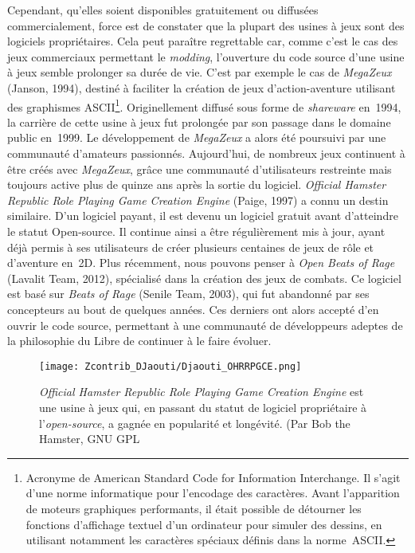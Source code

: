 \documentclass{FramateX}
\begin{document}
\begin{refsection}
Cependant, qu'elles soient disponibles gratuitement ou diffusées
commercialement, force est de constater que la plupart des usines à
jeux sont des logiciels propriétaires. Cela peut paraître regrettable
car, comme c'est le cas des jeux commerciaux permettant le
\textit{modding}, l'ouverture du code source d'une usine à jeux semble prolonger sa durée
de vie. C'est par exemple le cas de
\textit{MegaZeux} (Janson, 1994), destiné à
faciliter la création de jeux d'action-aventure utilisant des
graphismes ASCII\footnote{Acronyme de
American Standard Code for Information Interchange. Il s'agit d'une norme
informatique pour l'encodage des caractères. Avant l'apparition de
moteurs graphiques performants, il était possible de détourner les
fonctions d'affichage textuel d'un ordinateur pour simuler des dessins,
en utilisant notamment les caractères spéciaux définis dans la norme~ASCII.}.
Originellement diffusé sous forme de \textit{shareware} en~1994, la carrière de
cette usine à jeux fut prolongée par son passage dans le domaine public
en~1999. Le développement de
\textit{MegaZeux} a alors été poursuivi par
une communauté d'amateurs passionnés. Aujourd'hui, de nombreux jeux
continuent à être créés avec
\textit{MegaZeux}, grâce une communauté
d'utilisateurs restreinte mais toujours active plus de quinze ans après
la sortie du logiciel. \textit{Official
Hamster Republic Role Playing Game Creation Engine} (Paige, 1997) a
connu un destin similaire. D'un logiciel payant, il est devenu un
logiciel gratuit avant d'atteindre le statut Open-source. Il continue
ainsi a être régulièrement mis à jour, ayant déjà permis à ses
utilisateurs de créer plusieurs centaines de jeux de rôle et d'aventure
en~2D. Plus récemment, nous pouvons penser à
\textit{Open Beats of Rage} (Lavalit Team, 2012), spécialisé dans la création des jeux de combats. Ce logiciel est
basé sur \textit{Beats of Rage} (Senile Team,
2003), qui fut abandonné par ses concepteurs au bout de quelques
années. Ces derniers ont alors accepté d'en ouvrir le code source,
permettant à une communauté de développeurs adeptes de la philosophie
du Libre de continuer à le faire évoluer. 

\begin{figure}
\centering
\texttt{[image: Zcontrib\_DJaouti/Djaouti\_OHRRPGCE.png]}
\caption{\textit{Official Hamster Republic Role Playing Game Creation Engine} est une usine à jeux qui, en passant du statut de logiciel propriétaire à l'\textit{open-source}, a gagnée en popularité et longévité. (Par Bob the Hamster, GNU GPL}
\end{figure}


\end{refsection}
\end{document}
